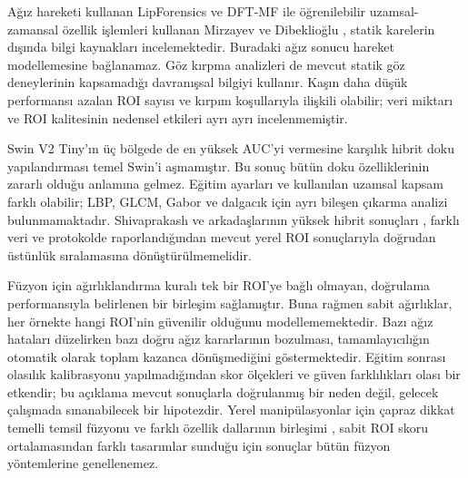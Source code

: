 \documentclass[a4paper]{elektr}
\begin{document}
Ağız hareketi kullanan LipForensics ve DFT-MF \cite{haliassos,elhassan} ile öğrenilebilir uzamsal-zamansal özellik işlemleri kullanan Mirzayev ve Dibeklioğlu \cite{mirzayev}, statik karelerin dışında bilgi kaynakları incelemektedir. Buradaki ağız sonucu hareket modellemesine bağlanamaz. Göz kırpma analizleri \cite{li,jung} de mevcut statik göz deneylerinin kapsamadığı davranışsal bilgiyi kullanır. Kaşın daha düşük performansı azalan ROI sayısı ve kırpım koşullarıyla ilişkili olabilir; veri miktarı ve ROI kalitesinin nedensel etkileri ayrı ayrı incelenmemiştir.

Swin V2 Tiny'ın üç bölgede de en yüksek AUC'yi vermesine karşılık hibrit doku yapılandırması temel Swin'i aşmamıştır. Bu sonuç bütün doku özelliklerinin zararlı olduğu anlamına gelmez. Eğitim ayarları ve kullanılan uzamsal kapsam farklı olabilir; LBP, GLCM, Gabor ve dalgacık için ayrı bileşen çıkarma analizi bulunmamaktadır. Shivaprakash ve arkadaşlarının yüksek hibrit sonuçları \cite{shivaprakash}, farklı veri ve protokolde raporlandığından mevcut yerel ROI sonuçlarıyla doğrudan üstünlük sıralamasına dönüştürülmemelidir.

Füzyon için ağırlıklandırma kuralı tek bir ROI'ye bağlı olmayan, doğrulama performansıyla belirlenen bir birleşim sağlamıştır. Buna rağmen sabit ağırlıklar, her örnekte hangi ROI'nin güvenilir olduğunu modellememektedir. Bazı ağız hataları düzelirken bazı doğru ağız kararlarının bozulması, tamamlayıcılığın otomatik olarak toplam kazanca dönüşmediğini göstermektedir. Eğitim sonrası olasılık kalibrasyonu yapılmadığından skor ölçekleri ve güven farklılıkları olası bir etkendir; bu açıklama mevcut sonuçlarla doğrulanmış bir neden değil, gelecek çalışmada sınanabilecek bir hipotezdir. Yerel manipülasyonlar için çapraz dikkat temelli temsil füzyonu \cite{anand} ve farklı özellik dallarının birleşimi \cite{lei}, sabit ROI skoru ortalamasından farklı tasarımlar sunduğu için sonuçlar bütün füzyon yöntemlerine genellenemez.
\end{document}
